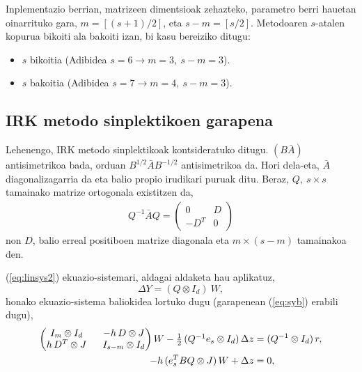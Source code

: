 Inplementazio berrian, matrizeen dimentsioak zehazteko, parametro berri hauetan oinarrituko gara,
$m=[(s+1)/2]$, eta $s-m =[s/2]$. Metodoaren $s$-atalen kopurua bikoiti ala bakoiti izan, bi kasu bereiziko ditugu:
\begin{itemize}
\item $s$ bikoitia (Adibidea $s=6 \rightarrow m=3,\ s-m=3$).
\item $s$ bakoitia (Adibidea $s=7 \rightarrow m=4,\ s-m=3$).
\end{itemize}

\subsection{IRK metodo sinplektikoen garapena}
\label{ss:733}

Lehenengo, IRK metodo sinplektikoak kontsideratuko ditugu. $(B \bar{A})$ antisimetrikoa bada, orduan $B^{1/2}\bar{A}B^{-1/2}$ antisimetrikoa da. Hori dela-eta, $\bar{A}$ diagonalizagarria da eta  balio propio irudikari puruak ditu. Beraz,  $Q, \ s \times s$ tamainako matrize ortogonala existitzen da,
\begin{align}
\label{eq:syb}
Q^{-1}\bar{A}Q=
\left(
\begin{matrix}
0 & D \\
-D^T & 0
\end{matrix}
\right)
\end{align}
non $D$,  balio erreal positiboen matrize diagonala eta $m \times (s-m)$ tamainakoa den. 

(\ref{eq:linsys2}) ekuazio-sistemari, aldagai aldaketa hau aplikatuz,
\begin{equation*}
 \Delta Y = (Q \otimes I_d) \ W,
\end{equation*}
%
honako ekuazio-sistema baliokidea lortuko dugu (garapenean (\ref{eq:syb}) erabili dugu),
\begin{equation}
\label{eq:linsys3}
\begin{split}
  \left(
  \begin{matrix}
    I_m \otimes I_d \ & \  -h \, D \otimes J  \\
    h \, D^T \otimes J \ & \ I_{s-m} \otimes I_d 
  \end{matrix}
\right) W -  \textstyle \frac12\, (Q^{-1} e_s \otimes I_d) \, \Delta z &=  (Q^{-1} \otimes I_d )\, r, \\
- h \, (e_s^T  B Q \otimes J) \, W + \Delta z &= 0,
\end{split}
\end{equation}

